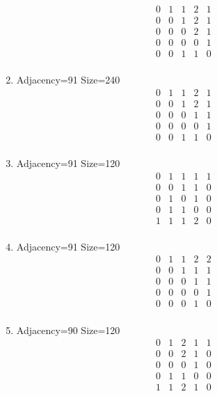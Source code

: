 \documentclass[12pt]{article}
\begin{document}
\begin{multicols}{3}
\begin{enumerate}
\begin{equation*}
\begin{array}{ccccc}
0&1&1&2&1\\
0&0&1&2&1\\
0&0&0&2&1\\
0&0&0&0&1\\
0&0&1&1&0\\
\end{array}
\end{equation*}
\item Adjacency=91 Size=240
\begin{equation*}
\begin{array}{ccccc}
0&1&1&2&1\\
0&0&1&2&1\\
0&0&0&1&1\\
0&0&0&0&1\\
0&0&1&1&0\\
\end{array}
\end{equation*}
\item Adjacency=91 Size=120
\begin{equation*}
\begin{array}{ccccc}
0&1&1&1&1\\
0&0&1&1&0\\
0&1&0&1&0\\
0&1&1&0&0\\
1&1&1&2&0\\
\end{array}
\end{equation*}
\item Adjacency=91 Size=120
\begin{equation*}
\begin{array}{ccccc}
0&1&1&2&2\\
0&0&1&1&1\\
0&0&0&1&1\\
0&0&0&0&1\\
0&0&0&1&0\\
\end{array}
\end{equation*}
\item Adjacency=90 Size=120
\begin{equation*}
\begin{array}{ccccc}
0&1&2&1&1\\
0&0&2&1&0\\
0&0&0&1&0\\
0&1&1&0&0\\
1&1&2&1&0\\
\end{array}
\end{equation*}

\end{enumerate}
\end{multicols}
\end{document}
